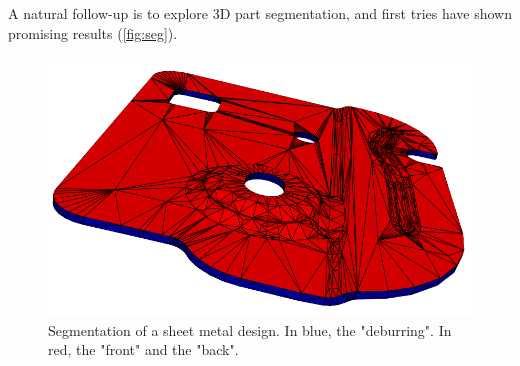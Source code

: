 \documentclass{article}
\begin{document}
A natural follow-up is to explore 3D part segmentation, and first tries have shown promising results (\autoref{fig:seg}). 

\begin{figure}[]
    \centering
    \includegraphics[width=.7\columnwidth]{assets/seg_0.png}
    \caption{Segmentation of a sheet metal design. In blue, the "deburring". In red, the "front" and the "back".}
    \label{fig:seg}
\end{figure}

\nocite{langley00}



\end{document}
